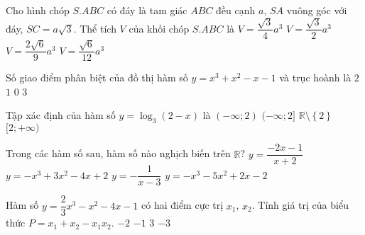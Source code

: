 \begin{ex}%
Cho hình chóp $S.ABC$ có đáy là tam giác $ABC$ đều cạnh $a$, $SA$ vuông góc với đáy, $SC=a\sqrt{3}$. Thể tích $V$ của khối chóp $S.ABC$ là
\choice
{ $V=\dfrac{\sqrt{3}}{4}a^3$}
{ $ V=\dfrac{ \sqrt{3}}{2}a^3$}
{ $V=\dfrac{2\sqrt{6}}{9}a^3$}
{\True $V=\dfrac{\sqrt{6}}{12}a^3$ }
\end{ex}

\begin{ex}%
Số giao điểm phân biệt của đồ thị hàm số $y=x^3+x^2-x-1$ và trục hoành là
\choice
{ \True $2$}
{$1$}
{$0$ }
{$3$}
\end{ex}

\begin{ex}%
Tập xác định của hàm số $y=\log_3(2-x)$ là
\choice
{\True $(-\infty;2)$}
{$(-\infty;2]$}
{$\mathbb{R}\setminus\left\{2\right\}$}
{$[2;+\infty)$}
\end{ex}

\begin{ex}%
Trong các hàm số sau, hàm số nào nghịch biến trên $\mathbb{R}$?
\choice
{$y=\dfrac{-2x-1}{x+2}$}
{\True $y=-x^3+3x^2-4x+2$}
{ $y=-\dfrac{1}{x-3}$}
{$y=-x^3-5x^2+2x-2$}
\end{ex}

\begin{ex}%
Hàm số $y=\dfrac{2}{3}x^3-x^2-4x-1$ có hai điểm cực trị $x_1$, $x_2$. Tính giá trị của biểu thức $P=x_1+x_2-x_1x_2$.
\choice
{$-2$}
{$-1$}
{\True $3$}
{$-3$}
\end{ex}

